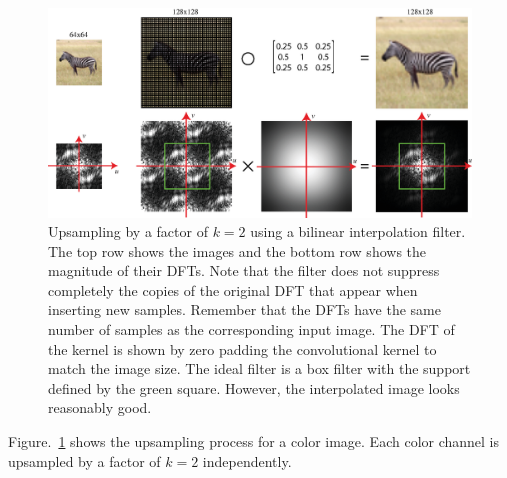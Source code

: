 \begin{figure}
  \includegraphics[width=1\linewidth]{figures/upsamplig_downsampling/upsampling_bilinear.eps}
  \caption{Upsampling by a factor of $k=2$ using a bilinear interpolation filter. The top row shows the images and the bottom row shows the magnitude of their DFTs. Note that the filter does not suppress completely the copies of the original DFT that appear when inserting new samples. Remember that the DFTs have the same number of samples as the corresponding input image. The DFT of the kernel is shown by zero padding the convolutional kernel to match the image size. The ideal filter is a box filter with the support defined by the green square.  However, the interpolated image looks reasonably good.
  }
  \label{fig:upsamplingazebra}
\end{figure}

Figure.~\ref{fig:upsamplingazebra} shows the upsampling process for a color image. Each color channel is upsampled by a factor of $k=2$ independently.


